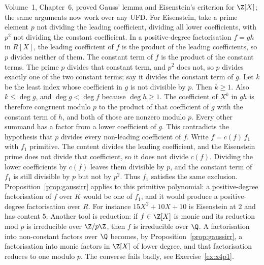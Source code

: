 Volume~1, Chapter~6, proved Gauss' lemma and Eisenstein's criterion for $\Z[X]$; the same arguments now work over any UFD. For Eisenstein, take a prime
element $p$ not dividing the leading coefficient, dividing all lower
coefficients, with $p^2$ not dividing the constant coefficient. In a
positive-degree factorisation $f=gh$ in $R[X]$, the leading coefficient of $f$ is the product of the leading coefficients, so $p$ divides neither of them. The constant term of $f$ is the product of the constant terms. The prime $p$ divides that constant term, and $p^2$ does not, so $p$ divides exactly one of the two constant terms; say it divides the constant term of $g$. Let $k$ be the least index whose coefficient in $g$ is not divisible by $p$. Then $k\ge1$. Also $k\le\deg g$, and $\deg g<\deg f$ because $\deg h\ge1$. The coefficient of $X^k$ in $gh$ is therefore congruent modulo $p$ to the product of that coefficient of $g$ with the constant term of $h$, and both of those are nonzero modulo $p$. Every other summand has a factor from a lower coefficient of $g$. This contradicts the hypothesis that $p$ divides every non-leading coefficient of $f$.
Write $f=c(f)\,f_1$ with $f_1$ primitive. The content divides the leading coefficient, and the Eisenstein prime does not divide that coefficient, so it does not divide $c(f)$. Dividing the lower coefficients by $c(f)$ leaves them divisible by $p$, and the constant term of $f_1$ is still divisible by $p$ but not by $p^2$. Thus $f_1$ satisfies the same exclusion. Proposition~\ref{prop:gaussirr} applies to this primitive polynomial: a positive-degree factorisation of $f$ over $K$ would be one of $f_1$, and it would produce a positive-degree factorisation over $R$. For instance $15X^2+10X+10$ is Eisenstein at $2$ and has content $5$. Another tool is reduction: if $f\in\Z[X]$ is monic and its reduction mod $p$ is irreducible over $\Z/p\Z$, then $f$ is irreducible over $\Q$. A factorisation into non-constant factors over $\Q$ becomes, by Proposition~\ref{prop:gaussirr}, a factorisation into monic factors in $\Z[X]$ of lower degree, and that factorisation reduces to one modulo $p$. The converse fails badly, see Exercise~\ref{ex:x4p1}.

